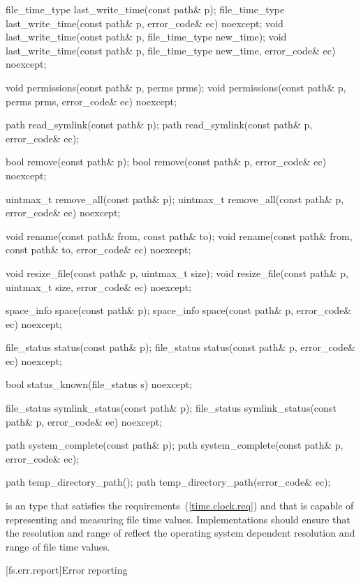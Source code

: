 \begin{codeblock}
{  file_time_type last_write_time(const path& p);
  file_time_type last_write_time(const path& p, error_code& ec) noexcept;
  void last_write_time(const path& p, file_time_type new_time);
  void last_write_time(const path& p, file_time_type new_time,
                       error_code& ec) noexcept;

  void permissions(const path& p, perms prms);
  void permissions(const path& p, perms prms, error_code& ec) noexcept;

  path read_symlink(const path& p);
  path read_symlink(const path& p, error_code& ec);

  bool remove(const path& p);
  bool remove(const path& p, error_code& ec) noexcept;

  uintmax_t remove_all(const path& p);
  uintmax_t remove_all(const path& p, error_code& ec) noexcept;

  void rename(const path& from, const path& to);
  void rename(const path& from, const path& to, error_code& ec) noexcept;

  void resize_file(const path& p, uintmax_t size);
  void resize_file(const path& p, uintmax_t size, error_code& ec) noexcept;

  space_info space(const path& p);
  space_info space(const path& p, error_code& ec) noexcept;

  file_status status(const path& p);
  file_status status(const path& p, error_code& ec) noexcept;

  bool status_known(file_status s) noexcept;

  file_status symlink_status(const path& p);
  file_status symlink_status(const path& p, error_code& ec) noexcept;

  path system_complete(const path& p);
  path system_complete(const path& p, error_code& ec);

  path temp_directory_path();
  path temp_directory_path(error_code& ec);
}
\end{codeblock}

\pnum
{} is an  type
that satisfies the  requirements~(\ref{time.clock.req})
and that is capable of representing and measuring file time values.
Implementations should ensure that the resolution and range of
 reflect the operating system dependent resolution and range
of file time values.

[fs.err.report]{Error reporting}

